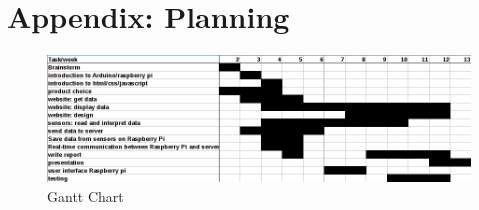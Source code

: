 \section{Appendix: Planning}
\begin{figure}[H]
  \center
  \includegraphics[width=5in]{./appendix_planning/ganttchart.png}
  \caption{Gantt Chart}
  \label{image:ganttchart}
\end{figure}
